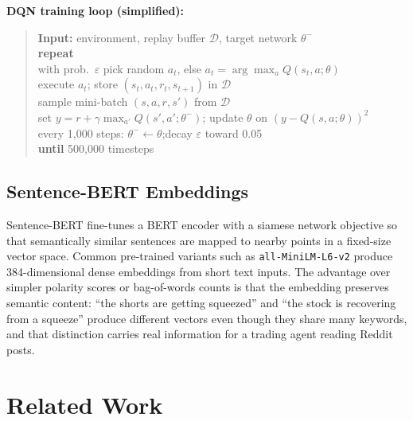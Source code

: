 \documentclass[letterpaper,twocolumn]{article}
\begin{document}
\smallskip
\noindent\textbf{DQN training loop (simplified):}
\begin{quote}
\noindent\textbf{Input:} environment, replay buffer $\mathcal{D}$, target network $\theta^{-}$\\[1pt]
\textbf{repeat}\\[1pt]
\hspace*{1.2em}with prob.\ $\varepsilon$ pick random $a_t$, else $a_t = \arg\max_a Q(s_t,a;\theta)$\\[1pt]
\hspace*{1.2em}execute $a_t$; store $(s_t, a_t, r_t, s_{t+1})$ in $\mathcal{D}$\\[1pt]
\hspace*{1.2em}sample mini-batch $(s,a,r,s')$ from $\mathcal{D}$\\[1pt]
\hspace*{1.2em}set $y = r + \gamma\max_{a'} Q(s',a';\theta^{-})$; update $\theta$ on $(y - Q(s,a;\theta))^2$\\[1pt]
\hspace*{1.2em}every 1{,}000 steps: $\theta^{-} \leftarrow \theta$;\enspace decay $\varepsilon$ toward 0.05\\[1pt]
\textbf{until} 500{,}000 timesteps
\end{quote}

\subsection{Sentence-BERT Embeddings}

Sentence-BERT \citep{reimers2019sentence} fine-tunes a BERT
encoder \citep{devlin2019bert} with a siamese network
objective so that semantically similar sentences are mapped
to nearby points in a fixed-size vector space.
Common pre-trained variants such as \texttt{all-MiniLM-L6-v2}
produce 384-dimensional dense embeddings from short text inputs.
The advantage over simpler polarity scores or bag-of-words
counts is that the embedding preserves semantic content:
``the shorts are getting squeezed'' and ``the stock is
recovering from a squeeze'' produce different vectors even
though they share many keywords, and that distinction carries
real information for a trading agent reading Reddit posts.

\section{Related Work}
\end{document}
